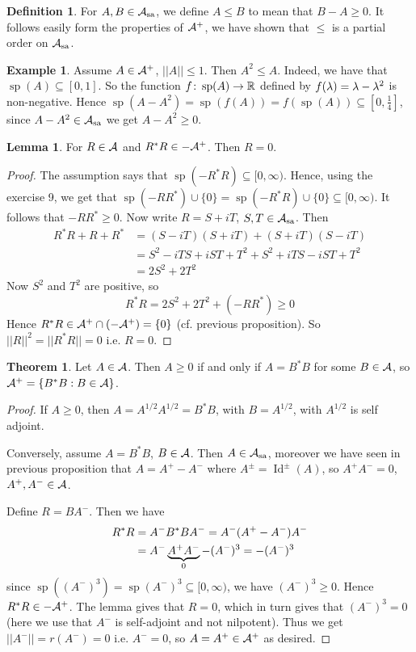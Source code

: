 \documentclass[10pt,english,a4paper]{article}
\theoremstyle{definition}
\newtheorem*{definition}{Definition}
\newtheorem*{theorem}{Theorem}
\newtheorem*{lemma}{Lemma}
\newtheorem*{example}{Example}
\def\Assa{\As_{\text{sa}}}
\DeclareMathOperator{\Id}{Id}
\DeclareMathOperator{\Sp}{sp}
\begin{document}
\begin{definition}
    For $A,B \in \Assa$, we define $A \leq B$ to mean that $B-A \geq 0$. It follows 
    easily form the properties of $\mathcal{A}^+$, we have shown that $\leq$ is a
    partial order on $\Assa$.
\end{definition}
\begin{example}
    Assume $A \in \mathcal{A}^+$, $||A|| \leq 1$. Then $A^2 \leq A$. Indeed, we have that 
    $\Sp(A) \subseteq [0,1]$. So the function $f\colon \Sp(A)\to \R$ 
defined by $f(\lambda) = \lambda - \lambda^2$ is non-negative. Hence 
$\Sp(A-A^2) = \Sp(f(A)) = f(\Sp(A)) \subseteq [0,\tfrac{1}{4}]$, since $A-A^2 \in \Assa$
we get $A-A^2 \geq 0$.
\end{example}

\begin{lemma}
    For $R \in \mathcal{A}$ and $R^*R \in -\mathcal{A}^+$. Then $R =0$.
\end{lemma}
\begin{proof}
    The assumption says that $\Sp(-R^*R) \subseteq [ 0, \infty)$. Hence, using 
    the exercise 9, we get that $\Sp(-RR^*)\cup\{0\} = \Sp(-R^*R)\cup \{0\}
    \subseteq [0,\infty)$. It follows that $-RR^* \geq 0$.
    Now write $R = S + iT$, $S,T \in \Assa$. Then 
    \begin{align*}
    R^*R+R+R^* &= (S-iT)(S+iT) + (S+iT)(S-iT) \\
    &= S^2 -iTS + iST + T^2 + S^2 + iTS -iST + T^2\\
    &= 2S^2 + 2T^2
    \end{align*}    
    Now $S^2$ and $T^2$ are positive, so 
    \[R^* R = 2S^2 + 2T^2 + (-RR^*) \geq 0\]
    Hence $R^*R \in \mathcal{A}^+ \cap (-\mathcal{A}^+) = \{0\}$ (cf. previous proposition).
    So $||R||^2 = ||R^*R|| = 0$ i.e. $R=0$.

\end{proof}

\begin{theorem}
    Let $A \in \mathcal{A}$. Then $A \geq 0$ if and only if $A = B^*B$
for some $B \in \mathcal{A}$, so $\mathcal{A}^+ = \{ B^*B : B \in \mathcal{A} \}$.
\end{theorem}
\begin{proof}
    If $A\geq 0$, then $A = A^{1/2}A^{1/2} = B^*B$, with $B = A^{1/2}$, with 
$A^{1/2}$ is self adjoint. 

Conversely, assume $A = B^*B$, $B \in \mathcal{A}$. Then $A \in \Assa$, moreover we have 
seen in previous proposition that $A = A^+ -A^-$ where $A^{\pm}  = \Id^{\pm}(A)$,
so $A^+A^- = 0$, $A^+,A^- \in \mathcal{A}$.

Define $R = BA^-$. Then we have
\begin{align*}
    R^*R &= A^-B^*BA^- = A^-(A^+-A^-)A^- \\
         &= A^- \underbrace{A^+A^-}_{0} - (A^-)^3 = - (A^-)^3
\end{align*}
since $\Sp((A^-)^3) = \Sp(A^-)^3 \subseteq [0,\infty)$, we have
$(A^-)^3 \geq 0$. Hence $R^*R \in -\mathcal{A}^+$.
The lemma gives that $R=0$, which in turn gives that $(A^-)^3 = 0$ 
(here we use that $A^-$ is self-adjoint and not nilpotent).  
Thus we get $||A^-|| = r(A^-) = 0$ i.e. $A^{-} = 0$, so $A = A^{+} \in \mathcal{A}^+$
as desired. 
\end{proof}
\end{document}
